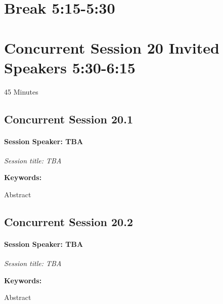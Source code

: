 \documentclass[
]{book}
\begin{document}
\hypertarget{break-515-530-1}{%
\section*{Break \textbar{} 5:15-5:30}\label{break-515-530-1}}

\hypertarget{concurrent-session-20-invited-speakers-530-615}{%
\section*{Concurrent Session 20 \textbar{} Invited Speakers \textbar{} 5:30-6:15}\label{concurrent-session-20-invited-speakers-530-615}}

45 Minutes

\hypertarget{concurrent-session-20.1}{%
\subsection*{Concurrent Session 20.1}\label{concurrent-session-20.1}}

\begin{speaker}
\hypertarget{session-speaker-tba}{%
\paragraph{\texorpdfstring{Session Speaker:
\textbf{TBA}}{Session Speaker: TBA}}\label{session-speaker-tba}}

\emph{Session title: TBA}

\textbf{Keywords:}

Abstract
\end{speaker}

\hypertarget{concurrent-session-20.2}{%
\subsection*{Concurrent Session 20.2}\label{concurrent-session-20.2}}

\begin{speaker}
\hypertarget{session-speaker-tba}{%
\paragraph{\texorpdfstring{Session Speaker:
\textbf{TBA}}{Session Speaker: TBA}}\label{session-speaker-tba}}

\emph{Session title: TBA}

\textbf{Keywords:}

Abstract
\end{speaker}
\end{document}
